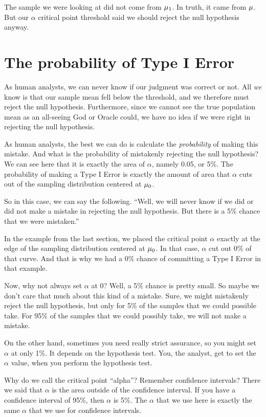 \documentclass[../../../main.tex]{subfiles}
\begin{document}
The sample we were looking at did not come from $\mu_{1}$. In truth, it came from $\mu$. But our $\alpha$ critical point threshold said we should reject the null hypothesis anyway.


\section{The probability of Type I Error}

As human analysts, we can never know if our judgment was correct or not. All \emph{we} know is that our sample mean fell below the threshold, and we therefore must reject the null hypothesis. Furthermore, since we cannot see the true population mean as an all-seeing God or Oracle could, we have no idea if we were right in rejecting the null hypothesis.

As human analysts, the best we can do is calculate the \emph{probability} of making this mistake. And what is the probability of mistakenly rejecting the null hypothesis? We can see here that it is exactly the area of $\alpha$, namely 0.05, or 5\%. The probability of making a Type I Error is exactly the amount of area that $\alpha$ cuts out of the sampling distribution centered at $\HypPopMean/$. 

So in this case, we can say the following. ``Well, we will never know if we did or did not make a mistake in rejecting the null hypothesis. But there is a 5\% chance that we were mistaken.''

In the example from the last section, we placed the critical point $\alpha$ exactly at the edge of the sampling distribution centered at $\HypPopMean/$. In that case, $\alpha$ cut out 0\% of that curve. And that is why we had a 0\% chance of committing a Type I Error in that example. 

Now, why not always set $\alpha$ at 0? Well, a 5\% chance is pretty small. So maybe we don't care that much about this kind of a mistake. Sure, we might mistakenly reject the null hypothesis, but only for 5\% of the samples that we could possible take. For 95\% of the samples that we could possibly take, we will not make a mistake.

On the other hand, sometimes you need really strict assurance, so you might set $\alpha$ at only 1\%. It depends on the hypothesis test. You, the analyst, get to set the $\alpha$ value, when you perform the hypothesis test.

Why do we call the critical point ``alpha''? Remember confidence intervals? There we said that $\alpha$ is the area outside of the confidence interval. If you have a confidence interval of 95\%, then $\alpha$ is 5\%. The $\alpha$ that we use here is exactly the same $\alpha$ that we use for confidence intervals.
\end{document}
